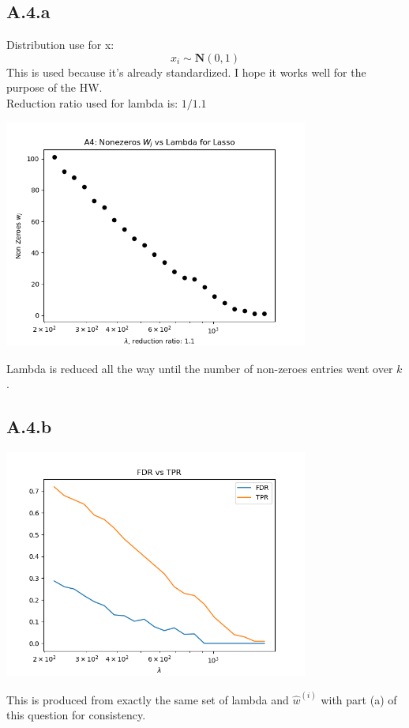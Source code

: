 \documentclass[]{article}
\begin{document}
    \subsection*{A.4.a}
        Distribution use for x: 
        $$
            x_i \sim \mathbf{N}(0, 1)
        $$
        This is used because it's already standardized. I hope it works well for the purpose of the HW. 
        \\
        Reduction ratio used for lambda is: $1/1.1$
        \begin{center}
            \includegraphics[width=10cm]{A4a-plot.png}
        \end{center}
        Lambda is reduced all the way until the number of non-zeroes entries went over $k$. 
    \subsection*{A.4.b}
        \begin{center}
            \includegraphics[width=10cm]{A4b-plot.png}
        \end{center}
        This is produced from exactly the same set of lambda and $\hat{w}^{(i)}$ with part (a) of this question for consistency. 
\end{document}
